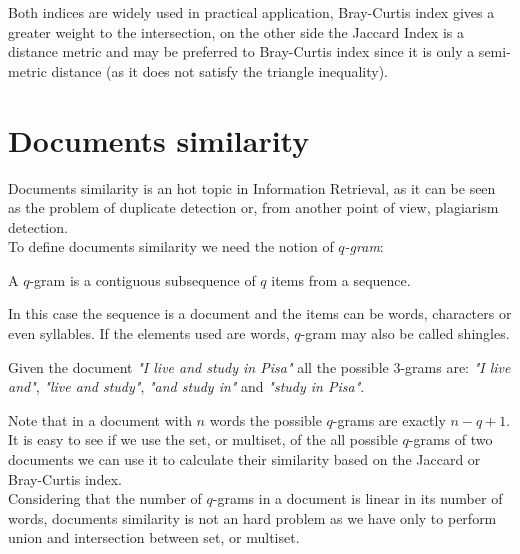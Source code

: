 Both indices are widely used in practical application, Bray-Curtis index gives a greater weight to the intersection, on the other side the Jaccard Index is a distance metric and may be preferred to Bray-Curtis index since it is only a semi-metric distance (as it does not satisfy the triangle inequality). 

\clearpage

\section{Documents similarity}

Documents similarity is an hot topic in Information Retrieval, as it can be seen as the problem of duplicate detection or, from another point of view, plagiarism detection.\\

To define documents similarity we need the notion of \textit{$q$-gram}:

\begin{definizione}
	A $q$-gram is a contiguous subsequence of $q$ items from a sequence.
\end{definizione}

In this case the sequence is a document and the items can be words, characters or even syllables. If the elements used are words, $q$-gram may also be called shingles.

\begin{esempio}
	Given the document \textit{"I live and study in Pisa"} all the possible $3$-grams are: 
	\textit{"I live and"}, \textit{"live and study"}, \textit{"and study in"} and \textit{"study in Pisa"}.
\end{esempio}

Note that in a document with $n$ words the possible $q$-grams are exactly $n-q+1$.\\

It is easy to see if we use the set, or multiset, of the all possible $q$-grams of two documents we can use it to calculate their similarity based on the Jaccard or Bray-Curtis index.\\

Considering that the number of $q$-grams in a document is linear in its number of words, documents similarity is not an hard problem as we have only to perform union and intersection between set, or multiset.

